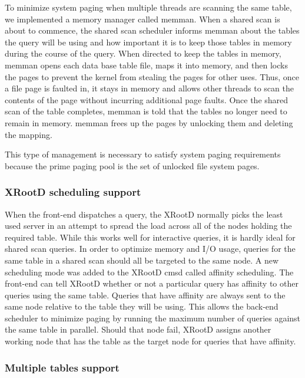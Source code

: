 \documentclass[DM,lsstdraft,toc]{lsstdoc}
\begin{document}
To minimize system paging when multiple threads are scanning the same
table, we implemented a memory manager called memman. When a
shared scan is about to commence, the shared scan scheduler informs
memman about the tables the query will be using and how
important it is to keep those tables in memory during the course of the
query. When directed to keep the tables in memory, memman opens
each data base table file, maps it into memory, and then locks the pages
to prevent the kernel from stealing the pages for other uses. Thus, once
a file page is faulted in, it stays in memory and allows other threads
to scan the contents of the page without incurring additional page
faults. Once the shared scan of the table completes, memman is
told that the tables no longer need to remain in memory. memman
frees up the pages by unlocking them and deleting the mapping.

This type of management is necessary to satisfy system paging
requirements because the prime paging pool is the set of unlocked file
system pages.

\subsubsection{\texorpdfstring{XRootD
scheduling
support}{XRootD scheduling support}}\label{shared-scan-xrootd-scheduling-support}

When the front-end dispatches a query, the
XRootD normally picks the least used server in
an attempt to spread the load across all of the nodes holding the
required table. While this works well for interactive queries, it is
hardly ideal for shared scan queries. In order to optimize memory and
I/O usage, queries for the same table in a shared scan should all be
targeted to the same node. A new scheduling mode was added to the
XRootD cmsd called affinity scheduling. The
front-end can tell XRootD whether or not a
particular query has affinity to other queries using the same table.
Queries that have affinity are always sent to the same node relative to
the table they will be using. This allows the back-end scheduler to
minimize paging by running the maximum number of queries against the
same table in parallel. Should that node fail,
XRootD assigns another working node that has
the table as the target node for queries that have affinity.

\subsubsection{Multiple tables support}\label{shared-scan-multiple-tables-support}
\end{document}
